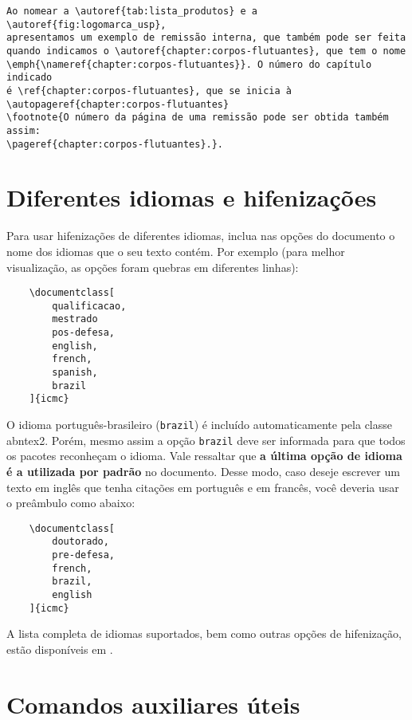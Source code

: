 \begin{verbatim}
Ao nomear a \autoref{tab:lista_produtos} e a \autoref{fig:logomarca_usp}, 
apresentamos um exemplo de remissão interna, que também pode ser feita 
quando indicamos o \autoref{chapter:corpos-flutuantes}, que tem o nome 
\emph{\nameref{chapter:corpos-flutuantes}}. O número do capítulo indicado 
é \ref{chapter:corpos-flutuantes}, que se inicia à 
\autopageref{chapter:corpos-flutuantes}
\footnote{O número da página de uma remissão pode ser obtida também assim: 
\pageref{chapter:corpos-flutuantes}.}.
\end{verbatim}

\section{Diferentes idiomas e hifenizações}
\label{sec-hifenizacao}

Para usar hifenizações de diferentes idiomas, inclua nas opções do documento o nome dos idiomas que o seu texto contém. Por exemplo (para melhor visualização, as opções foram quebras em diferentes linhas):

\begin{verbatim}
    \documentclass[
        qualificacao,
        mestrado
        pos-defesa,
        english,
        french,
        spanish,
        brazil
    ]{icmc}
\end{verbatim}

O idioma português-brasileiro (\texttt{brazil}) é incluído automaticamente pela classe \textsf{abntex2}. Porém, mesmo assim a opção \texttt{brazil} deve ser informada para que todos os pacotes reconheçam o idioma. Vale ressaltar que \textbf{a última opção de idioma é a utilizada por padrão} no documento. Desse modo, caso deseje escrever um texto em inglês que tenha citações em português e em francês, você deveria usar o preâmbulo como abaixo:

\begin{verbatim}
    \documentclass[
        doutorado,
        pre-defesa,
        french,
        brazil,
        english
    ]{icmc}
\end{verbatim}

A lista completa de idiomas suportados, bem como outras opções de hifenização, estão disponíveis em .


\section{Comandos auxiliares úteis}

